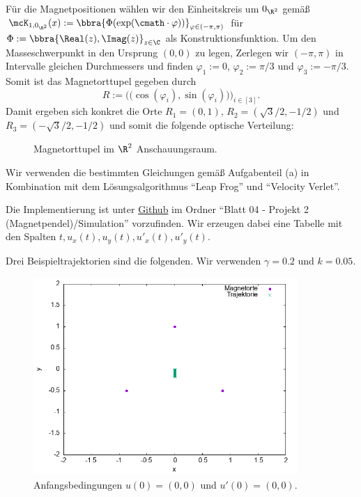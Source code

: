 \documentclass[
    oneside,
    ngerman,
    footinclude=false,
    captions=tableheading,
    DIV=12
]{scrartcl}
\begin{document}
\subaufgabe{}
    Für die Magnetpositionen wählen wir den Einheitskreis um $0_{\R^2}$ gemäß $\mcK_{1,0_{\R^2}}(x):=\bbra{\Phi({\exp}(\cmath\cdot\varphi))}_{\varphi\in(-\pi,\pi)}$ für $\Phi:=\bbra{\Real(z),\Imag(z)}_{z\in\C}$ als Konstruktionsfunktion. Um den Masseschwerpunkt in den Ursprung $(0,0)$ zu legen, Zerlegen wir $(-\pi,\pi)$ in Intervalle gleichen Durchmessers und finden $\varphi_1:=0$, $\varphi_2:=\pi/3$ und $\varphi_3:=-\pi/3$. Somit ist das Magnetorttupel gegeben durch
    \[
        R:=\Big(\big(\cos(\varphi_i),\sin(\varphi_i)\big)\Big)_{i\in[3]}.
    \]
    Damit ergeben sich konkret die Orte $R_1 = (0,1)$, $R_2 = (\sqrt{3}/2,-1/2)$ und $R_3 = (-\sqrt{3}/2,-1/2)$ und somit die folgende optische Verteilung:
    \begin{figure}[H]
        \centering
        \caption{Magnetorttupel im $\R^2$ Anschauungsraum.}
    \end{figure}


\subaufgabe{}
    Wir verwenden die bestimmten Gleichungen gemäß Aufgabenteil (a) in Kombination mit dem Lösungsalgorithmus \enquote{Leap Frog} und \enquote{Velocity Verlet}. 

\subaufgabe{}
    Die Implementierung ist unter \href{https://github.com/unb3rechenbar/ComputerPhysik-I-Projekte.git}{Github} im Ordner \enquote{Blatt 04 - Projekt 2 (Magnetpendel)/Simulation} vorzufinden. Wir erzeugen dabei eine Tabelle mit den Spalten $t,u_x(t),u_y(t),u'_x(t),u'_y(t)$. 

\subaufgabe{}
    Drei Beispieltrajektorien sind die folgenden. Wir verwenden $\gamma = 0.2$ und $k = 0.05$. 
    \begin{figure}[H]
        \centering
        \includegraphics[width=10cm]{../Simulation/img/trcs/velverl3-0-0-0-0.png}
        \caption{Anfangsbedingungen $u(0) = (0,0)$ und $u'(0) = (0,0)$.}
    \end{figure}
\end{document}
